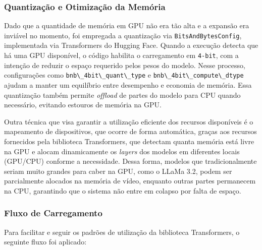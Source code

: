\subsubsection{Quantização e Otimização da Memória}

Dado que a quantidade de memória em GPU não era tão alta e a expansão era inviável no momento, foi empregada a quantização via \lstinline{BitsAndBytesConfig}, implementada via Transformers do Hugging Face. Quando a execução detecta que há uma GPU disponível, o código habilita o carregamento em \lstinline{4-bit}, com a intenção de reduzir o espaço requerido pelos pesos do modelo. Nesse processo, configurações como \lstinline{bnb\_4bit\_quant\_type} e \lstinline{bnb\_4bit\_compute\_dtype} ajudam a manter um equilíbrio entre desempenho e economia de memória. Essa quantização também permite \textit{offload} de partes do modelo para CPU quando necessário, evitando estouros de memória na GPU.

Outra técnica que visa garantir a utilização eficiente dos recursos disponíveis é o mapeamento de dispositivos, que ocorre de forma automática, graças aos recursos fornecidos pela biblioteca Transformers, que detectam quanta memória está livre na GPU e alocam dinamicamente os \textit{layers} dos modelos em diferentes locais (GPU/CPU) conforme a necessidade. Dessa forma, modelos que tradicionalmente seriam muito grandes para caber na GPU, como o LLaMa 3.2, podem ser parcialmente alocados na memória de vídeo, enquanto outras partes permanecem na CPU, garantindo que o sistema não entre em colapso por falta de espaço.

\subsubsection{Fluxo de Carregamento}

Para facilitar e seguir os padrões de utilização da biblioteca Transformers, o seguinte fluxo foi aplicado:

